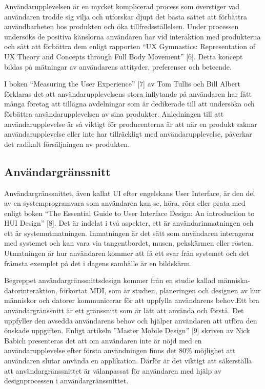 \documentclass[12pt]{kththesis}
\begin{document}
Användarupplevelsen är en mycket komplicerad process som överstiger vad användaren trodde sig vilja och utforskar djupt det bästa sättet att förbättra användbarheten hos produkten och öka tillfredsställelsen. Under processen undersöks de positiva känslorna användaren har vid interaktion med produkterna och sätt att förbättra dem enligt rapporten “UX Gymnastics: Representation of UX Theory and Concepts through Full Body Movement” [6]. Detta koncept bildas på mätningar av användarens attityder, preferenser och beteende. 

I boken “Measuring the User Experience” [7] av Tom Tullis och Bill Albert förklaras det att användarupplevelsens stora inflytande på användaren har fått många företag att tillägna avdelningar som är dedikerade till att undersöka och förbättra användarupplevelsen av sina produkter. Anledningen till att användarupplevelse är så viktigt för producenterna är att när en produkt saknar användarupplevelse eller inte har tillräckligt med användarupplevelse, påverkar det radikalt försäljningen av produkten. 

\subsection{Användargränssnitt}
Användargränssnittet, även kallat UI efter engelskans User Interface, är den del av en systemprogramvara som användaren kan se, höra, röra eller prata med enligt boken “The Essential Guide to User Interface Design: An introduction to HUI Design” [8]. Det är indelat i två aspekter, ett är användarinmatningen och ett är systemutmatningen. Inmatningen är det sätt som användaren interagerar med systemet och kan vara via tangentbordet, musen, pekskärmen eller rösten. Utmatningen är hur användaren kommer att få ett svar från systemet och det främsta exemplet på det i dagens samhälle är en bildskärm. 

Begreppet användargränssnittsdesign kommer från en studie kallad människa-datorinteraktion, förkortat MDI, som är studien, planeringen och designen av hur människor och datorer kommunicerar för att uppfylla användarens behov.Ett bra användargränssnitt är ett gränssnitt som är lätt att använda och förstå. Det uppfyller den avsedda användarens behov och hjälper användaren att utföra den önskade uppgiften. Enligt artikeln ”Master Mobile Design” [9] skriven av Nick Babich presenteras det att om användaren inte är nöjd med en användarupplevelse efter första användningen finns det 80\% möjlighet att användaren slutar använda en applikation. Därför är det viktigt att säkerställa att användargränssnittet är välanpassat för användaren med hjälp av designprocessen i användargränssnittet.
\end{document}
